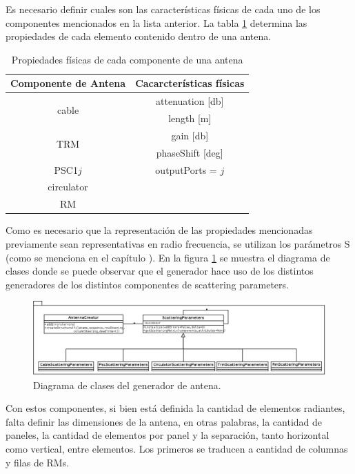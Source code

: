 Es necesario definir cuales son las características físicas de cada uno de los componentes mencionados en la lista anterior. 
La tabla \ref{tab:propertiesOfComponents} determina las propiedades de cada elemento contenido dentro de una antena. 

\begin{table}[H]
  \footnotesize
  \centering
  \begin{tabular}{|c|c|}
	\hline
	\textbf{Componente de Antena} & \textbf{Cacarcterísticas físicas} \tabularnewline \hline 
	\multirow{2}{*}{cable} &  attenuation [db] \tabularnewline \cline{2-2}
	 & length [m] \tabularnewline \hline 
	\multirow{2}{*}{TRM} & gain [db]\tabularnewline \cline{2-2}
	 & phaseShift [deg] \tabularnewline \hline 
	PSC1$j$ & outputPorts = $j$ \tabularnewline \hline 
	circulator & \tabularnewline \hline 
	RM & \tabularnewline \hline 
  \end{tabular}
  \caption{Propiedades físicas de cada componente de una antena}
  \label{tab:propertiesOfComponents}
\end{table}

Como es necesario que la representación de las propiedades mencionadas previamente sean representativas en radio frecuencia,
se utilizan los parámetros S (como se menciona en el capítulo ). En la figura 
\ref{fig:creationPackage} se muestra el diagrama de clases donde se puede observar que el generador hace uso de los distintos 
generadores de los distintos componentes de scattering parameters.

\begin{figure}
 \centering
 \includegraphics[width=15cm]{gfx/creationPackage.png}
 \caption{Diagrama de clases del generador de antena.}
 \label{fig:creationPackage}
\end{figure}

Con estos componentes, si bien está definida la cantidad de elementos radiantes, falta definir las dimensiones de la antena, 
en otras palabras, la cantidad de paneles, la cantidad de elementos por panel y la separación, tanto horizontal como vertical,
entre elementos. Los primeros se traducen a cantidad de columnas y filas de RMs. 

